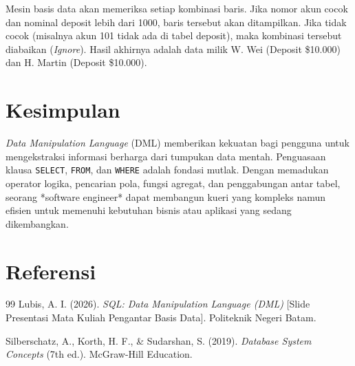\documentclass[11pt,a4paper]{article}
\begin{document}
Mesin basis data akan memeriksa setiap kombinasi baris. Jika nomor akun cocok dan nominal deposit lebih dari 1000, baris tersebut akan ditampilkan. Jika tidak cocok (misalnya akun 101 tidak ada di tabel deposit), maka kombinasi tersebut diabaikan (\textit{Ignore}). Hasil akhirnya adalah data milik W. Wei (Deposit \$10.000) dan H. Martin (Deposit \$10.000).

\section{Kesimpulan}

\textit{Data Manipulation Language} (DML) memberikan kekuatan bagi pengguna untuk mengekstraksi informasi berharga dari tumpukan data mentah. Penguasaan klausa \texttt{SELECT}, \texttt{FROM}, dan \texttt{WHERE} adalah fondasi mutlak. Dengan memadukan operator logika, pencarian pola, fungsi agregat, dan penggabungan antar tabel, seorang *software engineer* dapat membangun kueri yang kompleks namun efisien untuk memenuhi kebutuhan bisnis atau aplikasi yang sedang dikembangkan.

\newpage
\section*{Referensi}

\begin{thebibliography}{99}
	Lubis, A. I. (2026). \textit{SQL: Data Manipulation Language (DML)} [Slide Presentasi Mata Kuliah Pengantar Basis Data]. Politeknik Negeri Batam.

	Silberschatz, A., Korth, H. F., \& Sudarshan, S. (2019). \textit{Database System Concepts} (7th ed.). McGraw-Hill Education.
\end{thebibliography}
\end{document}
